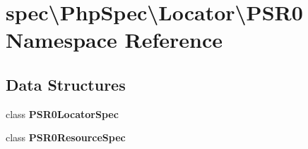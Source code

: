 \section{spec\textbackslash{}Php\+Spec\textbackslash{}Locator\textbackslash{}P\+S\+R0 Namespace Reference}
\label{namespacespec_1_1_php_spec_1_1_locator_1_1_p_s_r0}
\subsection*{Data Structures}
\begin{DoxyCompactItemize}
\item 
class {\bf P\+S\+R0\+Locator\+Spec}
\item 
class {\bf P\+S\+R0\+Resource\+Spec}
\end{DoxyCompactItemize}
